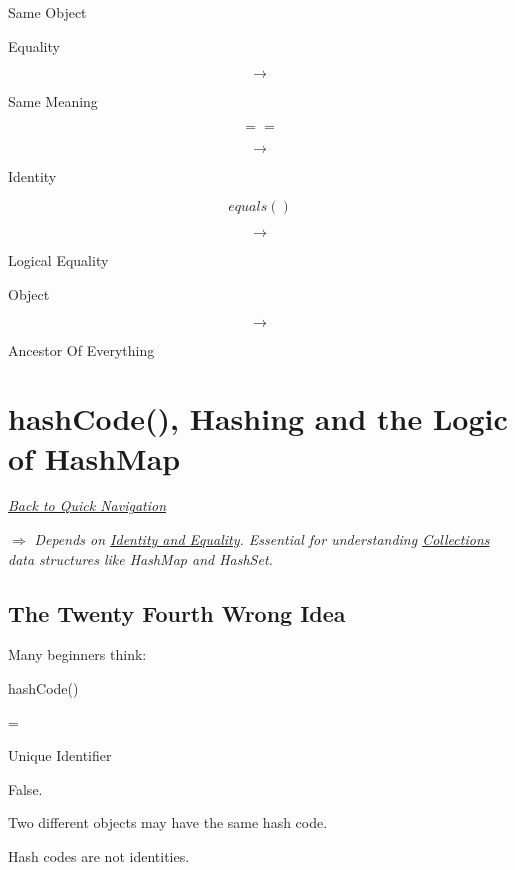 \documentclass[11pt,a4paper]{book}
\begin{document}
Same Object


Equality

\[
\rightarrow
\]

Same Meaning


\[
==
\]

\[
\rightarrow
\]

Identity


\[
equals()
\]

\[
\rightarrow
\]

Logical Equality


Object

\[
\rightarrow
\]

Ancestor Of Everything

\chapter{hashCode(), Hashing and the Logic of HashMap}

\smallskip
\noindent
\hyperref[sec:quick_nav]{\emph{Back to Quick Navigation}}

\smallskip
\noindent
\textcolor{RosettaRoyalPurple}{$\Rightarrow$}
\emph{Depends on \hyperref[chap:objects_identity]{Identity and Equality}. Essential for understanding \hyperref[chap:collections]{Collections} data structures like HashMap and HashSet.}


\section{The Twenty Fourth Wrong Idea}

\begin{trap}

Many beginners think:


hashCode()

=

Unique Identifier


False.


Two different objects may have
the same hash code.


Hash codes are not identities.

\end{trap}
\end{document}
